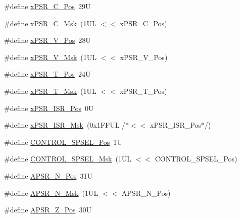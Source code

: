 \begin{DoxyCompactItemize}
\item 
\#define \mbox{\hyperlink{group___c_m_s_i_s___c_o_r_e_ga14adb79b91f6634b351a1b57394e2db6}{x\+P\+S\+R\+\_\+\+C\+\_\+\+Pos}}~29U
\item 
\#define \mbox{\hyperlink{group___c_m_s_i_s___c_o_r_e_ga21e2497255d380f956ca0f48d11d0775}{x\+P\+S\+R\+\_\+\+C\+\_\+\+Msk}}~(1\+U\+L $<$$<$ x\+P\+S\+R\+\_\+\+C\+\_\+\+Pos)
\item 
\#define \mbox{\hyperlink{group___c_m_s_i_s___c_o_r_e_gae0cfbb394490db402623d97e6a979e00}{x\+P\+S\+R\+\_\+\+V\+\_\+\+Pos}}~28U
\item 
\#define \mbox{\hyperlink{group___c_m_s_i_s___c_o_r_e_gab07f94ed3b6ee695f5af719dc27995c2}{x\+P\+S\+R\+\_\+\+V\+\_\+\+Msk}}~(1\+U\+L $<$$<$ x\+P\+S\+R\+\_\+\+V\+\_\+\+Pos)
\item 
\#define \mbox{\hyperlink{group___c_m_s_i_s___c_o_r_e_ga98d801da9a49cda944f52aeae104dd38}{x\+P\+S\+R\+\_\+\+T\+\_\+\+Pos}}~24U
\item 
\#define \mbox{\hyperlink{group___c_m_s_i_s___c_o_r_e_ga30ae2111816e82d47636a8d4577eb6ee}{x\+P\+S\+R\+\_\+\+T\+\_\+\+Msk}}~(1\+U\+L $<$$<$ x\+P\+S\+R\+\_\+\+T\+\_\+\+Pos)
\item 
\#define \mbox{\hyperlink{group___c_m_s_i_s___c_o_r_e_ga21bff245fb1aef9683f693d9d7bb2233}{x\+P\+S\+R\+\_\+\+I\+S\+R\+\_\+\+Pos}}~0U
\item 
\#define \mbox{\hyperlink{group___c_m_s_i_s___c_o_r_e_gadf8eed87e0081dfe1ef1c78a0ea91afd}{x\+P\+S\+R\+\_\+\+I\+S\+R\+\_\+\+Msk}}~(0x1\+F\+F\+U\+L /$\ast$$<$$<$ x\+P\+S\+R\+\_\+\+I\+S\+R\+\_\+\+Pos$\ast$/)
\item 
\#define \mbox{\hyperlink{group___c_m_s_i_s___c_o_r_e_ga07eafc53e609895342c6a530e9d01310}{C\+O\+N\+T\+R\+O\+L\+\_\+\+S\+P\+S\+E\+L\+\_\+\+Pos}}~1U
\item 
\#define \mbox{\hyperlink{group___c_m_s_i_s___c_o_r_e_ga70b29840969b06909da21369b0b05b53}{C\+O\+N\+T\+R\+O\+L\+\_\+\+S\+P\+S\+E\+L\+\_\+\+Msk}}~(1\+U\+L $<$$<$ C\+O\+N\+T\+R\+O\+L\+\_\+\+S\+P\+S\+E\+L\+\_\+\+Pos)
\item 
\#define \mbox{\hyperlink{group___c_m_s_i_s___c_o_r_e_gac469528d210043c7bd3f12f0e6824766}{A\+P\+S\+R\+\_\+\+N\+\_\+\+Pos}}~31U
\item 
\#define \mbox{\hyperlink{group___c_m_s_i_s___c_o_r_e_gadbc2cf55a026f661b53fadfcf822cef1}{A\+P\+S\+R\+\_\+\+N\+\_\+\+Msk}}~(1\+U\+L $<$$<$ A\+P\+S\+R\+\_\+\+N\+\_\+\+Pos)
\item 
\#define \mbox{\hyperlink{group___c_m_s_i_s___c_o_r_e_ga3661286d108b1aca308d7445685eae3a}{A\+P\+S\+R\+\_\+\+Z\+\_\+\+Pos}}~30U
$$
\end{DoxyCompactItemize}
